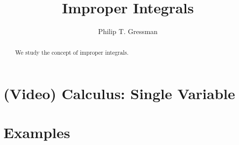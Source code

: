 \documentclass{ximera}
\title{Improper Integrals}
\author{Philip T. Gressman}
\begin{document}
\begin{abstract}
We study the concept of improper integrals.
\end{abstract}
\maketitle

\section*{(Video) Calculus: Single Variable}

\section*{Examples}

\begin{example}

\end{example}

\begin{example}

\end{example}
\end{document}
